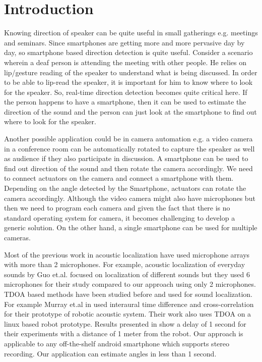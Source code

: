 \section{Introduction}
Knowing direction of speaker can be quite useful in small gatherings e.g. meetings and seminars. Since smartphones are getting more and more pervasive day by day, so smartphone based direction detection is quite useful.  Consider a scenario wherein a deaf person is attending the meeting with other people. He relies on lip/gesture reading of the speaker to understand what is being discussed. In order to be able to lip-read the speaker, it is important for him to know where to look for the speaker. So, real-time direction detection becomes quite critical here. If the person happens to have a smartphone, then it can be used to estimate the direction of the sound and the person can just look at the smartphone to find out where to look for the speaker.

Another possible application could be in camera automation e.g. a video camera in a conference room can be automatically rotated to capture the speaker as well as audience if they also participate in discussion. A smartphone can be used to find out direction of the sound and then rotate the camera accordingly. We need to connect actuators on the camera and connect a smartphone with them. Depending on the angle detected by the Smartphone, actuators can rotate the camera accordingly. Although the video camera might also have microphones but then we need to program each camera and given the fact that there is no standard operating system for camera, it becomes challenging to develop a generic solution. On the other hand, a single smartphone can be used for multiple cameras. 

Most of the previous work in acoustic localization have used microphone arrays with more than 2 microphones. For example, acoustic localization of everyday sounds by Guo et.al. \cite{everydaysounds} focused on localization of different sounds but they used 6 microphones for their study compared to our approach using only 2 microphones. TDOA based methods have been studied before and used for sound localization. For example Murray et.al in \cite{murray2004robotics} used interaural time difference and cross-correlation for their prototype of robotic acoustic system. Their work also uses TDOA on a linux based robot prototype. Results presented in \cite{murray2004robotics} show a delay of 1 second for their experiments with a distance of 1 meter from the robot. Our approach is applicable to any off-the-shelf android smartphone which supports stereo recording. Our application can estimate angles in less than 1 second. 

